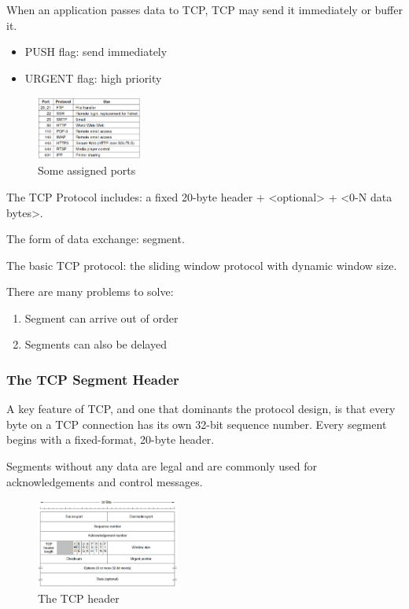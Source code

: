 When an application passes data to TCP, TCP may send it immediately or buffer it.
\begin{itemize}
    \item PUSH flag: send immediately
    \item URGENT flag: high priority
\end{itemize}

\begin{figure}[!htb]
    \centering
    \includegraphics[width=0.309\textwidth]{pic/CN6/Some assigned ports}
    \caption{Some assigned ports}
\end{figure}

The TCP Protocol includes: a fixed 20-byte header + <optional> + <0-N data bytes>. 

The form of data exchange: segment. 

The basic TCP protocol: the sliding window protocol with dynamic window size. 

There are many problems to solve:
\begin{enumerate}
    \item Segment can arrive out of order
    \item Segments can also be delayed
\end{enumerate}

\subsubsection{The TCP Segment Header}
A key feature of TCP, and one that dominants the protocol design, is that every byte on a TCP connection has its own 32-bit sequence number. Every segment begins with a fixed-format, 20-byte header. 

Segments without any data are legal and are commonly used for acknowledgements and control messages.

\begin{figure}[!htb]
    \centering
    \includegraphics[width=0.42\textwidth]{pic/CN6/The TCP header}
    \caption{The TCP header}
\end{figure}

